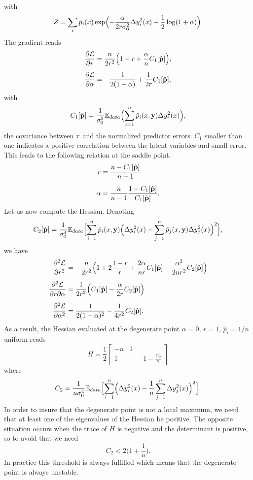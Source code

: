 \documentclass[envcountsect,runningheads]{llncs}
\theoremstyle{etoile}
\def\DD{\displaystyle}
\begin{document}
with
\[
Z = \sum_i \tilde p_i(x)\exp\Bigl(-\frac{\alpha}{2r\sigma_0^2}\Delta y_i^2(x)+\frac{1}{2}\log(1+\alpha)\Bigr).
\]
The gradient reads
\begin{align*}
  \frac{\partial {\cal L}}{\partial r} &= \frac{n}{2r^2}\Bigl(1-r+\frac{\alpha}{n}C_1[\hat {\bf p}]\Bigr),\\[0.2cm]
  \frac{\partial {\cal L}}{\partial \alpha} &= -\frac{1}{2(1+\alpha)}+\frac{1}{2r}C_1[\hat {\bf p}],  
\end{align*}
with
\[
C_1[\hat {\bf p}] = \frac{1}{\sigma_0^2}{\mathbb E}_{data}\Bigl(\sum_{i=1}^n \hat p_i(x,{\bf y})\Delta y_i^2(x)\Bigr),
\]
the covariance between ${\bf \tau}$ and the normalized predictor errors. $C_1$ smaller than one 
indicates a positive correlation between the latent variables and small error. 
This leads to the following relation at the saddle point:
\begin{align*}
  r &= \frac{n-C_1[\hat {\bf p}]}{n-1}\\[0.2cm]
\alpha &= \frac{n}{n-1}\frac{1-C_1[\hat {\bf p}]}{C_1[\hat {\bf p}]}.
\end{align*}
Let us now compute the Hessian. Denoting
\[
C_2[\hat {\bf p}] = \frac{1}{\sigma_0^4}{\mathbb E}_{data}\Bigl[\sum_{i=1}^n \hat p_i(x,{\bf y})\Bigl(\Delta y_i^2(x)-\sum_{j=1}^n\hat p_j(x,{\bf y})\Delta y_j^2(x)\Bigr)^2\Bigr],
\]
we have
\begin{align*}
\frac{\partial^2 {\cal L}}{\partial r^2} &= -\frac{n}{2r^2}\Bigl(1+2\frac{1-r}{r}+\frac{2\alpha}{nr}C_1[\hat {\bf p}]-\frac{\alpha^2}{2nr^2}C_2[\hat {\bf p}]\Bigr)\\[0.2cm]
\frac{\partial^2 {\cal L}}{\partial r\partial \alpha} &=\frac{1}{2r^2}\Bigl(C_1[\hat {\bf p}]-\frac{\alpha}{2r}C_2[\hat {\bf p}]\Bigr)\\[0.2cm]
\frac{\partial^2 {\cal L}}{\partial \alpha^2} &= \frac{1}{2(1+\alpha)^2}-\frac{1}{4r^2}C_2[\hat {\bf p}]. 
\end{align*}
As a result, the Hessian evaluated at the degenerate point $\alpha=0$, $r=1$, $\hat  p_i=1/n$ uniform reads
\[
H =\frac{1}{2}
\left[
  \begin{matrix}
 -n & 1\\[0.4cm] 
 1 & \qquad\DD 1-\frac{C_2}{2}
  \end{matrix}
  \right]
\]
where
\[
C_2 = \frac{1}{n\sigma_0^4}{\mathbb E}_{data}\Bigl[\sum_{i=1}^n \Bigl(\Delta y_i^2(x)-\frac{1}{n}\sum_{j=1}^n\Delta y_j^2(x)\Bigr)^2\Bigr].
\]
In order to insure that the degenerate point is not a local maximum, we need that at least one of the eigenvalues of the Hessian be positive.
The opposite situation occurs when the trace of $H$ is negative and the determinant is positive, so to avoid that we need
\[
C_2 < 2\bigl(1+\frac{1}{n}\bigr).
\]
In practice this threshold is always fulfilled which means that the degenerate point is always unstable.
\end{document}
